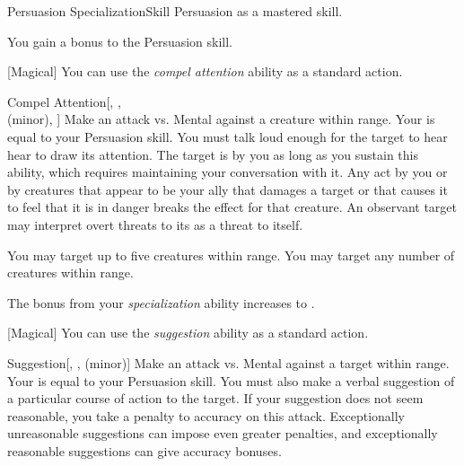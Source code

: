     \begin{feat}{Persuasion Specialization}{Skill}
        \featpre Persuasion as a mastered skill.

         You gain a  bonus to the Persuasion skill.

        [Magical] You can use the \textit{compel attention} ability as a standard action.
        \begin{freeability}{Compel Attention}[, ,\\ (minor), ]
            Make an attack vs. Mental against a creature within \rngmed range.
            Your  is equal to your Persuasion skill.
            You must talk loud enough for the target to hear hear to draw its attention.
            \hit The target is  by you as long as you sustain this ability, which requires maintaining your conversation with it.
            Any act by you or by creatures that appear to be your ally that damages a target or that causes it to feel that it is in danger breaks the effect for that creature.
            An observant target may interpret overt threats to its  as a threat to itself.

            \rankline
             You may target up to five creatures within range.
             You may target any number of creatures within range.
        \end{freeability}


         The bonus from your \textit{specialization} ability increases to .

        [Magical] You can use the \textit{suggestion} ability as a standard action.
        \begin{freeability}{Suggestion}[, ,  (minor)]
            Make an attack vs. Mental against a target within \rngmed range.
            Your  is equal to your Persuasion skill.
            You must also make a verbal suggestion of a particular course of action to the target.
            If your suggestion does not seem reasonable, you take a  penalty to accuracy on this attack.
            Exceptionally unreasonable suggestions can impose even greater penalties, and exceptionally reasonable suggestions can give accuracy bonuses.


\end{freeability}
\end{feat}
